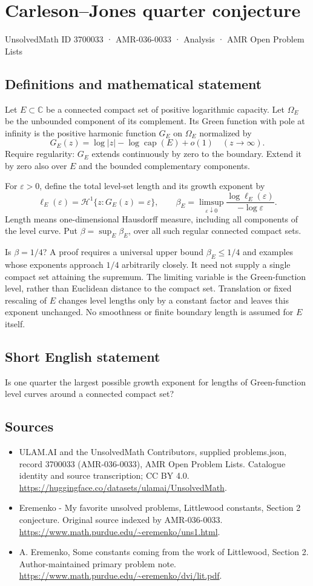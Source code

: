 \documentclass[11pt,a4paper]{article}
\begin{document}
\section*{Carleson–Jones quarter conjecture}\label{3700033}
{\small UnsolvedMath ID 3700033 · AMR-036-0033 · Analysis · AMR Open Problem Lists}
\subsection{Definitions and mathematical statement}
Let $E\subset\mathbb C$ be a connected compact set
of positive logarithmic capacity. Let $\Omega_E$
be the unbounded component of its complement.
Its Green function with pole at infinity is
the positive harmonic function $G_E$ on
$\Omega_E$ normalized by
\[
 G_E(z)=\log|z|-\log\operatorname{cap}(E)+o(1)
                                      \quad(z\to\infty).
\]
Require regularity: $G_E$ extends continuously by
zero to the boundary. Extend it by zero also
over $E$ and the bounded complementary components.

For $\varepsilon>0$, define the total level-set
length and its growth exponent by
\[
 \ell_E(\varepsilon)=
             \mathcal H^1\{z:G_E(z)=\varepsilon\},
 \qquad
 \beta_E=\limsup_{\varepsilon\downarrow0}
             \frac{\log\ell_E(\varepsilon)}{-\log\varepsilon}.
\]
Length means one-dimensional Hausdorff measure,
including all components of the level curve.
Put $\beta=\sup_E\beta_E$, over all such
regular connected compact sets.

Is $\beta=1/4$? A proof requires a universal
upper bound $\beta_E\leq1/4$ and examples
whose exponents approach $1/4$ arbitrarily
closely. It need not supply a single compact
set attaining the supremum.
The limiting variable is the Green-function
level, rather than Euclidean distance to the
compact set. Translation or fixed rescaling
of $E$ changes level lengths only by a
constant factor and leaves this exponent
unchanged. No smoothness or finite boundary
length is assumed for $E$ itself.
\subsection{Short English statement}
Is one quarter the largest possible growth exponent for lengths of Green-function level curves around a connected compact set?
\subsection{Sources}
\begin{itemize}
\item[S1] ULAM.AI and the UnsolvedMath Contributors, supplied problems.json, record 3700033 (AMR-036-0033), AMR Open Problem Lists. Catalogue identity and source transcription; CC BY 4.0.
\url{https://huggingface.co/datasets/ulamai/UnsolvedMath}.
\item[S2] Eremenko - My favorite unsolved problems, Littlewood constants, Section 2 conjecture. Original source indexed by AMR-036-0033.
\url{https://www.math.purdue.edu/~eremenko/uns1.html}.
\item[S3] A. Eremenko, Some constants coming from the work of Littlewood, Section 2. Author-maintained primary problem note.
\url{https://www.math.purdue.edu/~eremenko/dvi/lit.pdf}.
\end{itemize}
\end{document}

